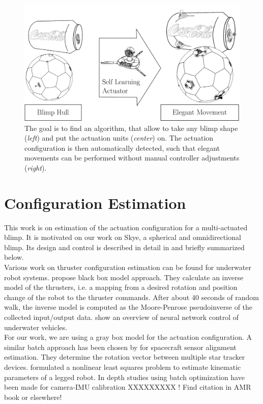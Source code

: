 \begin{figure}[hbtp]
\centering
\includegraphics[width=.85\linewidth]{images/motivation.png}
\caption{The goal is to find an algorithm, that allow to take any blimp shape (\textit{left}) and put the actuation units (\textit{center}) on. The actuation configuration is then automatically detected, such that elegant movements can be performed without manual controller adjustments (\textit{right}).}
\label{fig:motivation}
\end{figure}


\section{Configuration Estimation}
This work is on estimation of the actuation configuration for a multi-actuated blimp.
It is motivated on our work on Skye, a spherical and omnidirectional blimp.
Its design and control is described in detail in \citep{Skye2013} and briefly summarized below. \\
Various work on thruster configuration estimation can be found for underwater robot systems.
\citet{Doniec} propose black box model approach.
They calculate an inverse model of the thrusters, i.e. a mapping from a desired rotation and position change of the robot to the thruster commands. After about 40 seconds of random walk, the inverse model is computed as the Moore-Penrose pseudoinverse of the collected input/output data.
\citet{VandeVen2005} show an overview of neural network control of underwater vehicles. \\ 
For our work, we are using a gray box model for the actuation configuration.
A similar batch approach has been chosen by \citep{Shuster1991} for spacecraft sensor alignment estimation.
They determine the rotation vector between multiple star tracker devices. \citet{Bloesch2013} formulated a nonlinear least squares problem to estimate kinematic parameters of a legged robot.
In depth studies using batch optimization have been made for camera-IMU calibration XXXXXXXXX 
! Find citation in AMR book or elsewhere!


